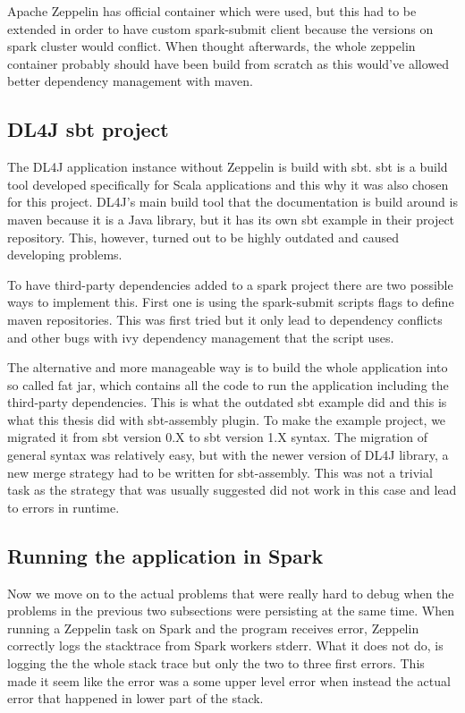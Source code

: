 Apache Zeppelin has official container which were used, but this had to be extended in order to have custom spark-submit client because the versions on spark cluster would conflict.
When thought afterwards, the whole zeppelin container probably should have been build from scratch as this would've allowed better dependency management with maven.

\subsection{DL4J sbt project}

The DL4J application instance without Zeppelin is build with sbt.
sbt is a build tool developed specifically for Scala applications and this why it was also chosen for this project.
DL4J's main build tool that the documentation is build around is maven because it is a Java library, but it has its own sbt example in their project repository.
This, however, turned out to be highly outdated and caused developing problems.

To have third-party dependencies added to a spark project there are two possible ways to implement this.
First one is using the spark-submit scripts flags to define maven repositories.
This was first tried but it only lead to dependency conflicts and other bugs with ivy dependency management that the script uses.

The alternative and more manageable way is to build the whole application into so called fat jar, which contains all the code to run the application including the third-party dependencies.
This is what the outdated sbt example did and this is what this thesis did with sbt-assembly plugin.
To make the example project, we migrated it from sbt version 0.X to sbt version 1.X syntax. 
The migration of general syntax was relatively easy, but with the newer version of DL4J library, a new merge strategy had to be written for sbt-assembly.
This was not a trivial task as the strategy that was usually suggested did not work in this case and lead to errors in runtime.

\subsection{Running the application in Spark}

Now we move on to the actual problems that were really hard to debug when the problems in the previous two subsections were persisting at the same time.
When running a Zeppelin task on Spark and the program receives error, Zeppelin correctly logs the stacktrace from Spark workers stderr.
What it does not do, is logging the the whole stack trace but only the two to three first errors.
This made it seem like the error was a some upper level error when instead the actual error that happened in lower part of the stack.

